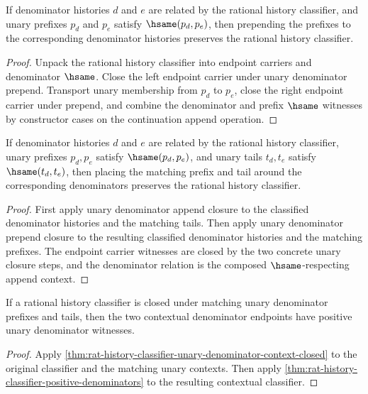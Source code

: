 \begin{theorem}
\label{thm:rat-history-classifier-prepend-unary-denominator-closed}
If denominator histories $d$ and $e$ are related by the rational history
classifier, and unary prefixes $p_d$ and $p_e$ satisfy $\hsame(p_d,p_e)$, then
prepending the prefixes to the corresponding denominator histories preserves the
rational history classifier.
\end{theorem}
\begin{proof}
Unpack the rational history classifier into endpoint carriers and denominator
$\hsame$. Close the left endpoint carrier under unary denominator prepend.
Transport unary membership from $p_d$ to $p_e$, close the right endpoint carrier
under prepend, and combine the denominator and prefix $\hsame$ witnesses by
constructor cases on the continuation append operation.
\end{proof}

\begin{theorem}
\label{thm:rat-history-classifier-unary-denominator-context-closed}
If denominator histories \(d\) and \(e\) are related by the rational history
classifier, unary prefixes \(p_d,p_e\) satisfy \(\hsame(p_d,p_e)\), and unary
tails \(t_d,t_e\) satisfy \(\hsame(t_d,t_e)\), then placing the matching prefix
and tail around the corresponding denominators preserves the rational history
classifier.
\end{theorem}
\begin{proof}
First apply unary denominator append closure to the classified denominator
histories and the matching tails. Then apply unary denominator prepend closure
to the resulting classified denominator histories and the matching prefixes.
The endpoint carrier witnesses are closed by the two concrete unary closure
steps, and the denominator relation is the composed \(\hsame\)-respecting
append context.
\end{proof}

\begin{theorem}
\label{thm:rat-history-classifier-unary-denominator-context-positive-denominators}
If a rational history classifier is closed under matching unary denominator
prefixes and tails, then the two contextual denominator endpoints have positive
unary denominator witnesses.
\end{theorem}
\begin{proof}
Apply \autoref{thm:rat-history-classifier-unary-denominator-context-closed}
to the original classifier and the matching unary contexts. Then apply
\autoref{thm:rat-history-classifier-positive-denominators} to the resulting
contextual classifier.
\end{proof}

